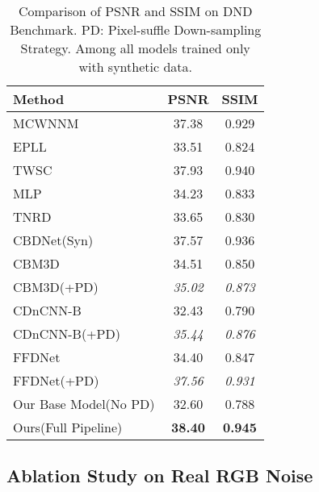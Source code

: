 \documentclass[letterpaper]{article} \usepackage{aaai20}  \usepackage{times}  \usepackage{helvet} \usepackage{courier}  \usepackage{comment}
\begin{document}
\begin{table}[t]\setlength{\tabcolsep}{1pt}
\centering
\caption{Comparison of PSNR and SSIM on DND Benchmark. PD: Pixel-suffle Down-sampling Strategy. Among all models trained only with synthetic data.}
\begin{tabular}{|l|c|c|}
\hline
Method &PSNR&SSIM \\ \hline 

MCWNNM\cite{xu2017multi}  &37.38 &0.929\\
EPLL\cite{zoran2011learning} & 33.51 &0.824\\
TWSC\cite{xu2018trilateral} &37.93&0.940\\
MLP\cite{burger2012image} & 34.23 &0.833\\
TNRD\cite{chen2017trainable}   &33.65& 0.830\\
CBDNet(Syn)\cite{guo2018toward}  &37.57 &0.936\\ 
\hline
CBM3D\cite{dabov2008image}  & 34.51 &0.850\\
CBM3D(+PD)  & \emph{35.02} &\emph{0.873}\\
\hline
CDnCNN-B\cite{zhang2017beyond} & 32.43 &0.790\\
CDnCNN-B(+PD) & \emph{35.44} &\emph{0.876}\\
\hline
FFDNet\cite{zhang2018ffdnet} & 34.40 &0.847\\
FFDNet(+PD)& \emph{37.56}&\emph{0.931}\\
\hline
Our Base Model(No PD) & 32.60&0.788\\
Ours(Full Pipeline) & \bf38.40&\bf0.945\\
\hline
\end{tabular}
\label{exp:DND}
\end{table}
\subsection{Ablation Study on Real RGB Noise}
\end{document}
